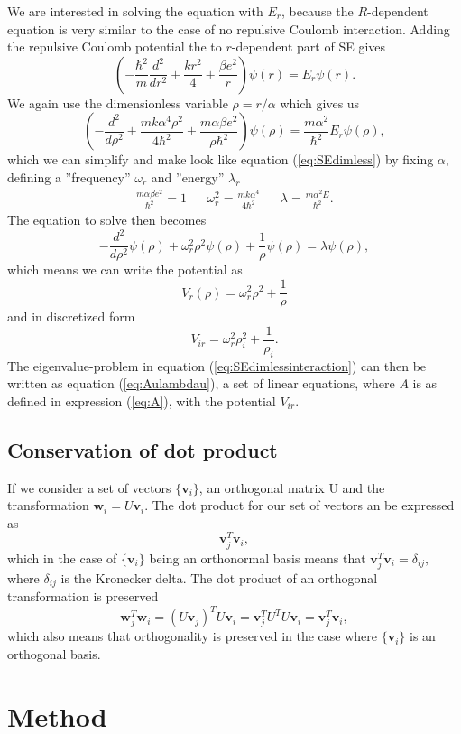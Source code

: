 \documentclass[norsk,a4paper,12pt]{article}
\begin{document}
We are interested in solving the equation with $E_r$, because the $R$-dependent equation is very similar to the case of no repulsive Coulomb interaction. Adding the repulsive Coulomb potential the to $r$-dependent part of SE gives
$$\left(-\frac{\hbar ^2}{m}\frac{d^2}{dr^2} + \frac{kr^2}{4} + \frac{\beta e^2}{r}\right)\psi(r) = E_r\psi(r).$$ 
We again use the dimensionless variable $\rho = r/\alpha$ which gives us 
$$\left(-\frac{d^2}{d\rho ^2} + \frac{mk\alpha ^4 \rho ^2}{4\hbar ^2} + \frac{m\alpha \beta e^2}{\rho \hbar^2}\right)\psi(\rho) = \frac{m\alpha ^2}{\hbar^2}E_r\psi(\rho),
$$
which we can simplify and make look like equation (\ref{eq:SEdimless}) by fixing $\alpha$, defining a ''frequency'' $\omega _r$ and ''energy'' $\lambda_r$
\begin{align*}
\frac{m\alpha\beta e^2}{\hbar^2} = 1 && \omega_r^2 = \frac{mk\alpha^4}{4\hbar^2} && \lambda = \frac{m\alpha^2E}{\hbar^2}.
\end{align*}
The equation to solve then becomes \begin{equation}
-\frac{d^2}{d\rho ^2}\psi (\rho) + \omega_r^2\rho^2\psi(\rho) + \frac{1}{\rho}\psi(\rho) = \lambda \psi (\rho),
\label{eq:SEdimlessinteraction}
\end{equation}
which means we can write the potential as $$V_r(\rho) = \omega_r^2\rho^2 + \frac{1}{\rho}$$
and in discretized form $$V_{ir} = \omega_r^2\rho_i^2 + \frac{1}{\rho_i}.$$
The eigenvalue-problem in equation (\ref{eq:SEdimlessinteraction}) can then be written as equation (\ref{eq:Aulambdau}), a set of linear equations, where $A$ is as defined in expression (\ref{eq:A}), with the potential $V_{ir}$.
\subsection{Conservation of dot product}
If we consider a set of vectors $\{\textbf{v}_i\}$, an orthogonal matrix U and the transformation $\textbf{w}_i = U\textbf{v}_i$. The dot product for our set of vectors an be expressed as $$\textbf{v}_j^T\textbf{v}_i,$$ which in the case of $\{\textbf{v}_i\}$ being an orthonormal basis means that $\textbf{v}_j^T\textbf{v}_i = \delta_{ij},$ where $\delta_{ij}$ is the Kronecker delta. The dot product of an orthogonal transformation is preserved
$$\textbf{w}_j^T \textbf{w}_i = (U\textbf{v}_j)^TU\textbf{v}_i = \textbf{v}_j^TU^TU\textbf{v}_i = \textbf{v}_j^T\textbf{v}_i,$$ which also means that orthogonality is preserved in the case where $\{\textbf{v}_i\}$ is an orthogonal basis.
\section{Method}
\end{document}
